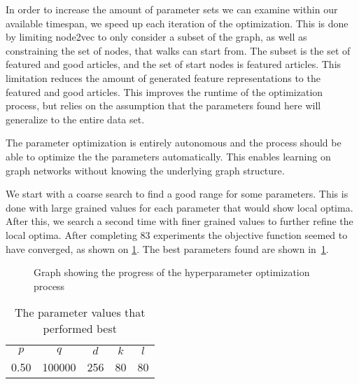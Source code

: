 In order to increase the amount of parameter sets we can examine within our available timespan, we speed up each iteration of the optimization. This is done by limiting node2vec to only consider a subset of the graph, as well as constraining the set of nodes, that walks can start from. The subset is the set of featured and good articles, and the set of start nodes is featured articles. This limitation reduces the amount of generated feature representations to the featured and good articles. This improves the runtime of the optimization process, but relies on the assumption that the parameters found here will generalize to the entire data set.

The parameter optimization is entirely autonomous and the process should be able to optimize the the parameters automatically. This enables learning on graph networks without knowing the underlying graph structure.

We start with a coarse search to find a good range for some parameters. This is done with large grained values for each parameter that would show local optima. After this, we search a second time with finer grained values to further refine the local optima. After completing 83 experiments the objective function seemed to have converged, as shown on \cref{fig:spearmint}. The best parameters found are shown in~\cref{tab:paramopt_goodvalues}.

\begin{figure}%
  \centering
  
\caption[Hyperparameter optimization]{Graph showing the progress of the hyperparameter optimization process}%
\label{fig:spearmint}%
\end{figure}

\begin{table}%
\centering
\begin{tabular}{ccccc}
\toprule
$p$  & $q$     & $d$ & $k$ & $l$ \\
\num{0.50} & \num{100000} & 256 & 80  & 80 \\
\bottomrule
\end{tabular}
\caption[The parameter values found to perform the best]{The parameter values that performed best}%
\label{tab:paramopt_goodvalues}%
\end{table}

